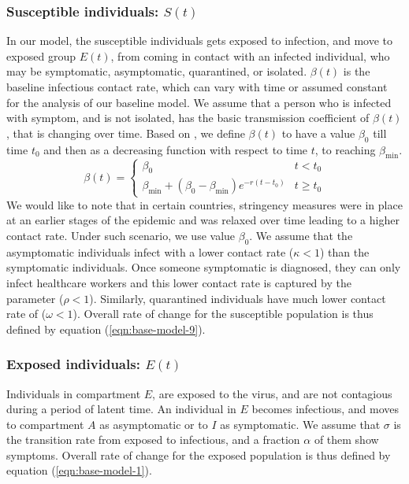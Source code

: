 \documentclass[authoryear,preprint]{elsarticle}
\begin{document}
\subsubsection{Susceptible individuals: $S(t)$}
In our model, the susceptible individuals gets exposed to infection, and move to exposed group $E(t)$, from coming in contact with an infected individual, who may be symptomatic, asymptomatic, quarantined, or isolated. $\beta(t)$ is the baseline infectious contact rate, which can vary with time or assumed constant for the analysis of our baseline model. We assume that a person who is infected with symptom, and is not isolated, has the basic transmission coefficient of $\beta(t)$, that is changing over time. Based on \cite{TANG2020248, EIKENBERRY2020293}, we define $\beta(t)$ to have a value $\beta_0$ till time $t_0$ and then as a decreasing function with respect to time $t$, to reaching $\beta_{\min}$. 
\begin{equation}
\beta(t) = 
\begin{cases}
\beta_0 & t < t_0 \\
\beta_{\min} + \left( \beta_0 - \beta_{\min}\right) e^{-r\left( t - t_0\right) } & t \geq t_0
\end{cases}
\label{eqn:base-model-11}
\end{equation}
We would like to note that in certain countries, stringency measures were in place at an earlier stages of the epidemic and was relaxed over time leading to a higher contact rate. Under such scenario, we use value $\beta_0$. We assume that the asymptomatic individuals infect with a lower contact rate ($\kappa < 1$) than the symptomatic individuals. Once someone symptomatic is diagnosed, they can only infect healthcare workers and this lower contact rate is captured by the parameter ($\rho < 1$). Similarly, quarantined individuals have much lower contact rate of ($\omega < 1$). Overall rate of change for the susceptible population is thus defined by equation (\ref{eqn:base-model-9}).

\subsubsection{Exposed individuals: $E(t)$}
Individuals in compartment $E$, are exposed to the virus, and are not contagious during a period of latent time. An individual in $E$ becomes infectious, and moves to compartment $A$ as asymptomatic or to $I$ as symptomatic. We assume that $\sigma$ is the transition rate from exposed to infectious, and a fraction $\alpha$ of them show symptoms. Overall rate of change for the exposed population is thus defined by equation (\ref{eqn:base-model-1}).
\end{document}
